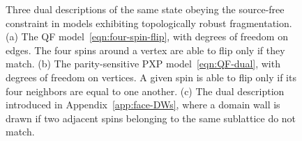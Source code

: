 \begin{figure}[t]
    \centering
    \hspace{0.6cm}%
    \hspace{0.6cm}%
    \caption[Three dual descriptions of the same state]{Three dual descriptions of the same state obeying the source-free constraint in models exhibiting topologically robust fragmentation. (a) The QF model~\eqref{eqn:four-spin-flip}, with degrees of freedom on edges. The four spins around a vertex are able to flip only if they match. (b) The parity-sensitive PXP model~\eqref{eqn:QF-dual}, with degrees of freedom on vertices. A given spin is able to flip only if its four neighbors are equal to one another. (c) The dual description introduced in Appendix~\ref{app:face-DWs}, where a domain wall is drawn if two adjacent spins belonging to the same sublattice do not match.}
    \label{fig:all-dualities}
\end{figure}

